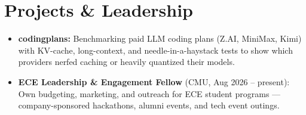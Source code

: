 \documentclass[11pt, letterpaper]{article}
\begin{document}
\section{Projects \& Leadership}
\begin{itemize}
  \item \textbf{codingplans:} Benchmarking paid LLM coding plans (Z.AI, MiniMax, Kimi) with KV-cache, long-context, and needle-in-a-haystack tests to show which providers nerfed caching or heavily quantized their models.
  \item \textbf{ECE Leadership \& Engagement Fellow} (CMU, Aug 2026 -- present): Own budgeting, marketing, and outreach for ECE student programs --- company-sponsored hackathons, alumni events, and tech event outings.
\end{itemize}
\end{document}
